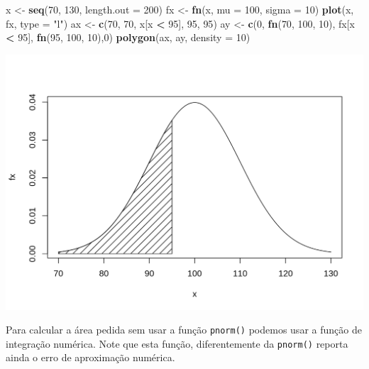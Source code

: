 \documentclass[10pt,a4paper]{book}
\newenvironment{Shaded}{\begin{snugshade}}{\end{snugshade}}
\newcommand{\KeywordTok}[1]{\textcolor[rgb]{0.13,0.29,0.53}{\textbf{#1}}}
\newcommand{\DataTypeTok}[1]{\textcolor[rgb]{0.13,0.29,0.53}{#1}}
\newcommand{\DecValTok}[1]{\textcolor[rgb]{0.00,0.00,0.81}{#1}}
\newcommand{\StringTok}[1]{\textcolor[rgb]{0.31,0.60,0.02}{#1}}
\newcommand{\OperatorTok}[1]{\textcolor[rgb]{0.81,0.36,0.00}{\textbf{#1}}}
\newcommand{\NormalTok}[1]{#1}
\begin{document}
\begin{Shaded}
\begin{Highlighting}[]
\NormalTok{x <-}\StringTok{ }\KeywordTok{seq}\NormalTok{(}\DecValTok{70}\NormalTok{, }\DecValTok{130}\NormalTok{, }\DataTypeTok{length.out =} \DecValTok{200}\NormalTok{)}
\NormalTok{fx <-}\StringTok{ }\KeywordTok{fn}\NormalTok{(x, }\DataTypeTok{mu =} \DecValTok{100}\NormalTok{, }\DataTypeTok{sigma =} \DecValTok{10}\NormalTok{)}
\KeywordTok{plot}\NormalTok{(x, fx, }\DataTypeTok{type =} \StringTok{"l"}\NormalTok{)}
\NormalTok{ax <-}\StringTok{ }\KeywordTok{c}\NormalTok{(}\DecValTok{70}\NormalTok{, }\DecValTok{70}\NormalTok{, x[x }\OperatorTok{<}\StringTok{ }\DecValTok{95}\NormalTok{], }\DecValTok{95}\NormalTok{, }\DecValTok{95}\NormalTok{)}
\NormalTok{ay <-}\StringTok{ }\KeywordTok{c}\NormalTok{(}\DecValTok{0}\NormalTok{, }\KeywordTok{fn}\NormalTok{(}\DecValTok{70}\NormalTok{, }\DecValTok{100}\NormalTok{, }\DecValTok{10}\NormalTok{), fx[x }\OperatorTok{<}\StringTok{ }\DecValTok{95}\NormalTok{], }\KeywordTok{fn}\NormalTok{(}\DecValTok{95}\NormalTok{, }\DecValTok{100}\NormalTok{, }\DecValTok{10}\NormalTok{),}\DecValTok{0}\NormalTok{)}
\KeywordTok{polygon}\NormalTok{(ax, ay, }\DataTypeTok{density =} \DecValTok{10}\NormalTok{)}
\end{Highlighting}
\end{Shaded}

\begin{center}\includegraphics{figures/unnamed-chunk-364-1} \end{center}

Para calcular a área pedida sem usar a função \texttt{pnorm()} podemos
usar a função de integração numérica. Note que esta função,
diferentemente da \texttt{pnorm()} reporta ainda o erro de aproximação
numérica.
\end{document}
